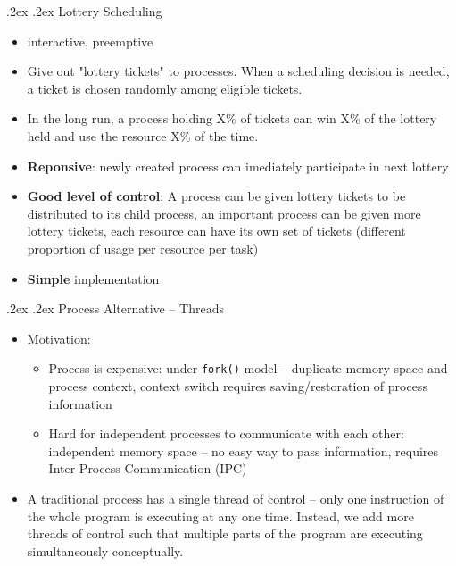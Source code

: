 \documentclass[10pt,landscape,a4paper]{article}
\makeatletter
\renewcommand{\section}{\@startsection{section}{1}{0mm}%
  {.2ex}%
  {.2ex}%
{\color{myblue}\sffamily\small\bfseries}}
\renewcommand{\subsubsection}{\@startsection{subsubsection}{1}{0mm}%
  {.2ex}%
  {.2ex}%
{\rmfamily\bfseries}}
\makeatother
\begin{document}
\begin{multicols*}{4}
  \subsubsection{Lottery Scheduling}
  \begin{itemize}
    \item interactive, preemptive
    \item Give out "lottery tickets" to processes. When a scheduling decision is needed, a ticket is chosen randomly among eligible tickets.
    \item In the long run, a process holding X\% of tickets can win X\% of the lottery held and use the resource X\% of the time.
    \item \textbf{Reponsive}: newly created process can imediately participate in next lottery
    \item \textbf{Good level of control}: A process can be given lottery tickets to be distributed to its child process, an important process can be given more lottery tickets, each resource can have its own set of tickets (different proportion of usage per resource per task)
    \item \textbf{Simple} implementation
  \end{itemize}

  \section{Process Alternative -- Threads}
  \begin{itemize}
    \item Motivation:
    \begin{itemize}
      \item Process is expensive: under \texttt{fork()} model -- duplicate memory space and process context, context switch requires saving/restoration of process information
      \item Hard for independent processes to communicate with each other: independent memory space -- no easy way to pass information, requires Inter-Process Communication (IPC)
    \end{itemize}
    \item A traditional process has a single thread of control -- only one instruction of the whole program is executing at any one time. Instead, we add more threads of control such that multiple parts of the program are executing simultaneously conceptually.
  \end{itemize}

\end{multicols*}
\end{document}
